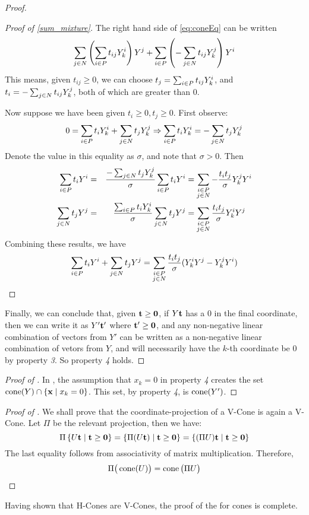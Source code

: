 \begin{proof}
\begin{proof}[Proof of \cref{sum_mixture}]
		The right hand side of \eqref{eq:coneEq} can be written
		\[ \sum_{j\in N} \left(\sum_{i\in P} t_{ij}Y^i_{k}\right) Y^j +
			\sum_{i\in P} \left(-\sum_{j\in N} t_{ij}Y^j_{k}\right) Y^i \]
		This means, given $t_{ij} \geq 0$, we can choose $t_j = \sum_{i\in P} t_{ij}Y^i_{k}$, and $t_i = -\sum_{j\in N} t_{ij}Y^j_{k}$, both of which are greater than $0$.

		Now suppose we have been given $t_i \geq 0, t_j \geq 0$.  First observe:
		\[ 0 = \sum_{i\in P} t_iY^i_{k} + \sum_{j\in N} t_jY^j_{k} \Rightarrow \sum_{i\in P} t_iY^i_{k} = -\sum_{j\in N} t_jY^j_{k}\]
		Denote the value in this equality as $\sigma$, and note that $\sigma > 0$.  Then
		\begin{alignat*}{3}
			\sum_{i\in P} t_i Y^i & = & \frac{-\sum_{j\in N} t_j Y^j_{k}}{\sigma}\sum_{i\in P} t_i Y^i & =
			\sum_{\substack{i\in P \\ j\in N}} -\frac{t_i t_j}{\sigma}Y^j_{k} Y^i                              \\
			\sum_{j\in N} t_j Y^j & = & \frac{\sum_{i\in P} t_i Y^i_{k}}{\sigma}\sum_{j\in N} t_j Y^j  & =
			\sum_{\substack{i\in P \\ j\in N}} \frac{t_i t_j}{\sigma}Y^i_{k} Y^j
		\end{alignat*}
		Combining these results, we have
		\[ \sum_{i\in P} t_i Y^i + \sum_{j\in N} t_j Y^j = \sum_{\substack{i\in P \\ j\in N}} \frac{t_i t_j}{\sigma}(Y^i_{k} Y^j - Y^j_{k} Y^i) \]
	\end{proof}
	Finally, we can conclude that, given $\mathbf{t} \geq \mathbf{0}$, if $Y\mathbf{t}$ has a $0$ in the final coordinate, then we can write it as $ Y'\mathbf{t}'$ where $\mathbf{t}' \geq \mathbf{0}$, and any non-negative linear combination of vectors from $Y'$ can be written as a non-negative linear combination of vetors from $Y$, and will necessarily have the $k$-th coordinate be $0$ by property \textit{3}.  So property \textit{4} holds.
\end{proof}

\begin{proof}[Proof of ]
	In , the assumption that $x_k = 0$ in property \textit{4} creates the set $\operatorname{cone}(Y) \cap \left\{\mathbf{x} \;|\; x_k = 0\right\}$.  This set, by property \textit{4}, is $\operatorname{cone}(Y')$.
\end{proof}

\begin{proof}[Proof of ]
	We shall prove that the coordinate-projection of a V-Cone is again a V-Cone.  Let $\Pi$ be the relevant projection, then we have:
	\[ \Pi\left\{U\mathbf{t} \;|\; \mathbf{t} \geq \mathbf{0}\right\} = \left\{\Pi(U\mathbf{t}) \;|\; \mathbf{t} \geq \mathbf{0}\right\} =
		\left\{(\Pi U)\mathbf{t} \;|\; \mathbf{t} \geq \mathbf{0}\right\} \]
	The last equality follows from associativity of matrix multiplication.  Therefore,
	\[ \Pi\big(\operatorname{cone}(U)\big) = \operatorname{cone}\big(\Pi U\big) \]
\end{proof}

Having shown that H-Cones are V-Cones, the proof of the {\MWT} for cones is complete.

